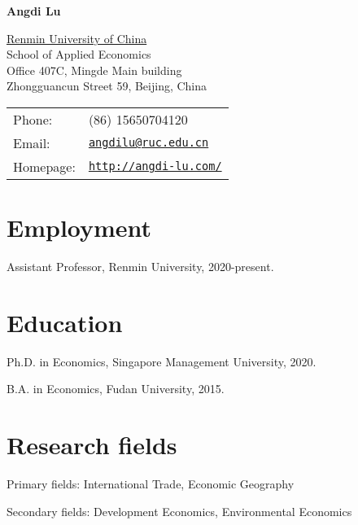 \documentclass[letterpaper]{article}
\def\name{Angdi Lu}
\renewenvironment{itemize}{
	\begin{list}{}{
			\setlength{\leftmargin}{1.5em}
		}
	}{
	\end{list}
}
\begin{document}
	
	{\huge \textbf{\name}}
	
	
	\vspace{0.25in}
	
	\begin{minipage}{0.5\linewidth}
		\href{http://www.ruc.edu.cn/}{Renmin University of China} \\
		School of Applied Economics \\
 Office	 407C, Mingde Main building \\
	 Zhongguancun Street 59, Beijing, China
	\end{minipage}
	\begin{minipage}{0.45\linewidth}
		\begin{tabular}{ll}
			Phone: & (86) 15650704120 \\
			Email: & \href{mailto:angdilu@ruc.edu.cn}{\tt angdilu@ruc.edu.cn} \\
			Homepage: & \href{http://angdi-lu.com/}{\tt http://angdi-lu.com/} \\
		\end{tabular}
	\end{minipage}

	
 


	
	
	\section*{\textbf{Employment}}
	
	\begin{itemize}
		\item Assistant Professor, Renmin University, 2020-present.  
	\end{itemize}

\section*{\textbf{Education}}
	\begin{itemize}
	\item Ph.D. in Economics, Singapore Management University, 2020.
	\item B.A. in Economics, Fudan University, 2015.
	\end{itemize}

\section*{\textbf{Research fields}}
\begin{itemize}
	\item 	Primary fields: International Trade, Economic Geography
	\item Secondary fields: Development Economics, Environmental Economics  
\end{itemize}
\end{document}
